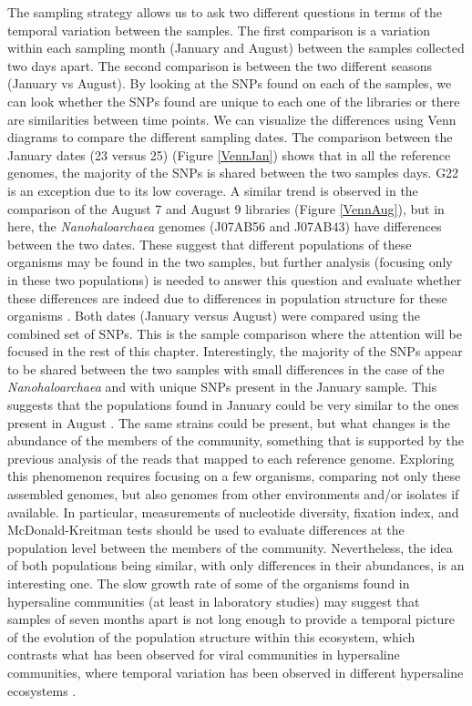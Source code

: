 The sampling strategy allows us to ask two different questions in terms of the temporal variation between the samples. The first comparison is a variation within each sampling month (January and August) between the samples collected two days apart. The second comparison is between the two different seasons (January vs August). By looking at the SNPs found on each of the samples, we can look whether the SNPs found are unique to each one of the libraries or there are similarities between time points. We can visualize the differences using Venn diagrams to compare the different sampling dates. The comparison between the January dates (23 versus 25) (Figure \ref{VennJan}) shows that in all the reference genomes, the majority of the SNPs is shared between the two samples days. G22 is an exception due to its low coverage. A similar trend is observed in the comparison of the August 7 and August 9 libraries (Figure \ref{VennAug}), but in here, the \textit{Nanohaloarchaea} genomes (J07AB56 and J07AB43) have differences between the two dates. These suggest that different populations of these organisms may be found in the two samples, but further analysis (focusing only in these two populations) is needed to answer this question and evaluate whether these differences are indeed due to differences in population structure for these organisms \cite{Schloissnig:2012hx,Shapiro:hi,Vos:2011ux}. Both dates (January versus August) were compared using the combined set of SNPs. This is the sample comparison where the attention will be focused in the rest of this chapter. Interestingly, the majority of the SNPs appear to be shared between the two samples with small differences in the case of the \textit{Nanohaloarchaea} and with unique SNPs present in the January sample. This suggests that the populations found in January could be very similar to the ones present in August \cite{Doolittle:2012hf}. The same strains could be present, but what changes is the abundance of the members of the community, something that is supported by the previous analysis of the reads that mapped to each reference genome. Exploring this phenomenon requires focusing on a few organisms, comparing not only these assembled genomes, but also genomes from other environments and/or isolates if available. In particular, measurements of nucleotide diversity, fixation index, and McDonald-Kreitman tests \cite{Schloissnig:2012hx,Simmons:2008by} should be used to evaluate differences at the population level between the members of the community. Nevertheless, the idea of both populations being similar, with only differences in their abundances, is an interesting one. The slow growth rate of some of the organisms found in hypersaline communities \cite{DyallSmith:2011tu} (at least in laboratory studies) may suggest that samples of seven months apart is not long enough to provide a temporal picture of the evolution of the population structure within this ecosystem, which contrasts what has been observed for viral communities in hypersaline communities, where temporal variation has been observed in different hypersaline ecosystems \cite{RodriguezBrito:2010in,Emerson:2012gh}.

